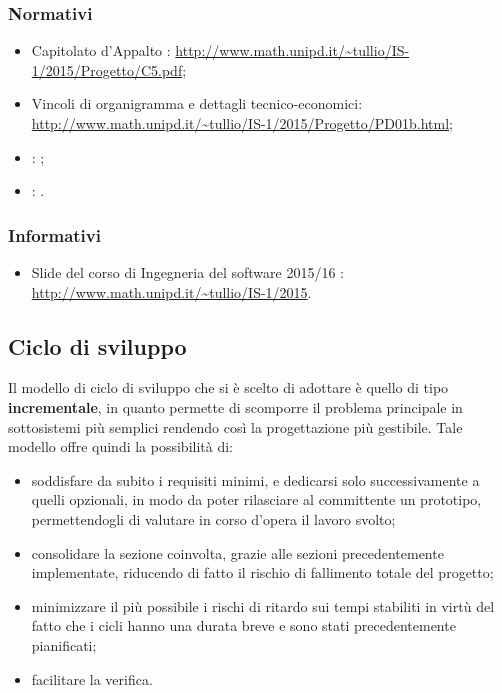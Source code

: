 \documentclass[12pt,a4paper]{article}
\begin{document}
\subsubsection{Normativi}
\begin{itemize}
	\item Capitolato d’Appalto \prjL: \url{http://www.math.unipd.it/~tullio/IS-1/2015/Progetto/C5.pdf};
	\item Vincoli di organigramma e dettagli tecnico-economici: \url{http://www.math.unipd.it/~tullio/IS-1/2015/Progetto/PD01b.html};
	\item \NdP: \NdPv{};
	\item \PdQ: \PdQv{}.
\end{itemize}

\subsubsection{Informativi}
\begin{itemize}
	\item Slide del corso di Ingegneria del software 2015/16 : \url{http://www.math.unipd.it/~tullio/IS-1/2015}.
\end{itemize}

\subsection{Ciclo di sviluppo}
Il modello di ciclo di sviluppo che si è scelto di adottare è quello di tipo \textbf{incrementale}, in quanto permette di scomporre il problema principale in sottosistemi più semplici rendendo così la progettazione più gestibile. Tale modello offre quindi la possibilità di:
\begin{itemize}
	\item soddisfare da subito i requisiti minimi, e dedicarsi solo successivamente a quelli opzionali, in modo da poter rilasciare al committente un prototipo, permettendogli di valutare in corso d'opera il lavoro svolto;
	\item consolidare la sezione coinvolta, grazie alle sezioni precedentemente implementate, riducendo di fatto il rischio di fallimento totale del progetto;
	\item minimizzare il più possibile i rischi di ritardo sui tempi stabiliti in virtù del fatto che i cicli hanno una durata breve e sono stati precedentemente pianificati;
	\item facilitare la verifica.
\end{itemize}
\end{document}
